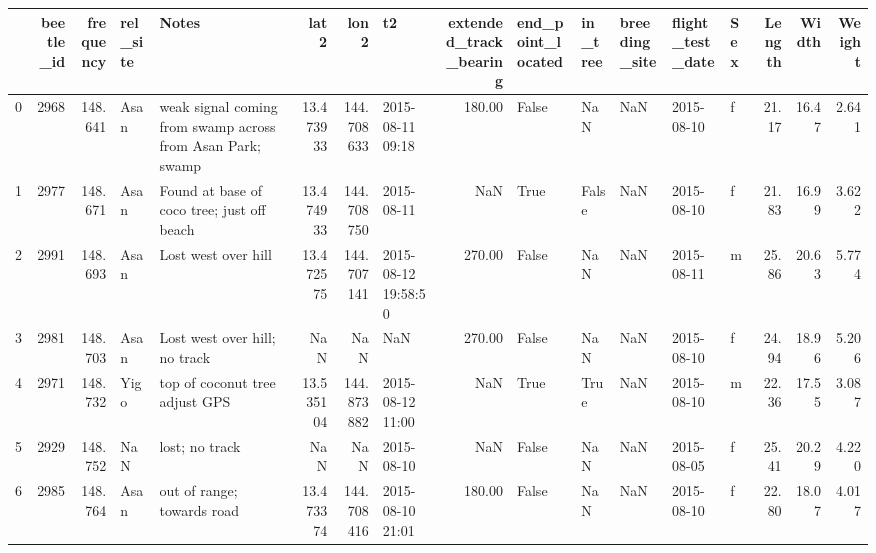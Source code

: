 \begin{tabular}{lrrllrrlrlllllrrr}
\toprule
{} &  beetle\_id &  frequency & rel\_site &                                                                                  Notes &       lat2 &        lon2 &                   t2 &  extended\_track\_bearing & end\_point\_located & in\_tree & breeding\_site & flight\_test\_date & Sex &  Length &  Width &  Weight \\
\midrule
0  &       2968 &    148.641 &     Asan &                             weak signal coming from swamp across from Asan Park; swamp &  13.473933 &  144.708633 &     2015-08-11 09:18 &                  180.00 &             False &     NaN &           NaN &       2015-08-10 &   f &   21.17 &  16.47 &   2.641 \\
1  &       2977 &    148.671 &     Asan &                                             Found at base of coco tree; just off beach &  13.474933 &  144.708750 &           2015-08-11 &                     NaN &              True &   False &           NaN &       2015-08-10 &   f &   21.83 &  16.99 &   3.622 \\
2  &       2991 &    148.693 &     Asan &                                                                    Lost west over hill &  13.472575 &  144.707141 &  2015-08-12 19:58:50 &                  270.00 &             False &     NaN &           NaN &       2015-08-11 &   m &   25.86 &  20.63 &   5.774 \\
3  &       2981 &    148.703 &     Asan &                                                          Lost west over hill; no track &        NaN &         NaN &                  NaN &                  270.00 &             False &     NaN &           NaN &       2015-08-10 &   f &   24.94 &  18.96 &   5.206 \\
4  &       2971 &    148.732 &     Yigo &                                                         top of coconut tree adjust GPS &  13.535104 &  144.873882 &     2015-08-12 11:00 &                     NaN &              True &    True &           NaN &       2015-08-10 &   m &   22.36 &  17.55 &   3.087 \\
5  &       2929 &    148.752 &      NaN &                                                                         lost; no track &        NaN &         NaN &           2015-08-10 &                     NaN &             False &     NaN &           NaN &       2015-08-05 &   f &   25.41 &  20.29 &   4.220 \\
6  &       2985 &    148.764 &     Asan &                                                             out of range; towards road &  13.473374 &  144.708416 &     2015-08-10 21:01 &                  180.00 &             False &     NaN &           NaN &       2015-08-10 &   f &   22.80 &  18.07 &   4.017 \\

\end{tabular}
